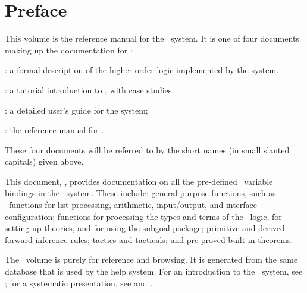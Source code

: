 \chapter*{Preface}

This volume is the reference manual for the \HOL\ system.
It is one of four documents making up the documentation for \HOL:

\begin{myenumerate}
\item \LOGIC: a formal description of the higher order logic
  implemented by the \HOL{} system.
\item \TUTORIAL: a tutorial introduction to \HOL, with case studies.
\item \DESCRIPTION: a detailed user's guide for the \HOL{} system;
\item \REFERENCE: the reference manual for \HOL.
\end{myenumerate}

\noindent These four documents will be referred to by the short names (in
small slanted capitals) given above.

This document, \REFERENCE, provides documentation on all the pre-defined \ML\
variable bindings in the \HOL\ system.  These include: general-purpose
functions, such as \ML\ functions for list processing, arithmetic,
input/output, and interface configuration; functions for processing the types
and terms of the \HOL\ logic, for setting up theories, and for using the
subgoal package; primitive and derived forward inference rules; tactics and
tacticals; and pre-proved built-in theorems.


The \REFERENCE\ volume is purely for reference and browsing. It is generated
from the same database that is used by the help system. For an introduction to
the \HOL\ system, see \TUTORIAL; for a systematic presentation, see
\DESCRIPTION{}  and \LOGIC{}.
